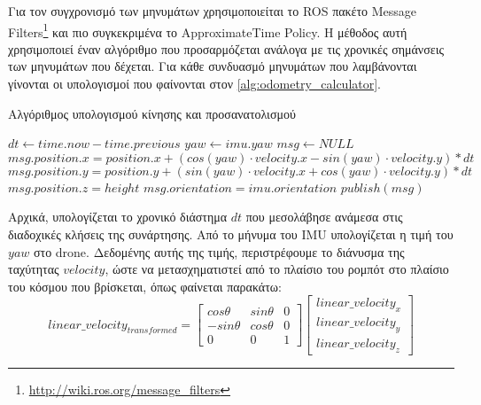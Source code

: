 Για τον συγχρονισμό των μηνυμάτων χρησιμοποιείται το ROS πακέτο Message Filters\footnote{\href{http://wiki.ros.org/message\_filters}{http://wiki.ros.org/message\_filters}} και πιο συγκεκριμένα το ApproximateTime Policy. Η μέθοδος αυτή χρησιμοποιεί έναν αλγόριθμο που προσαρμόζεται ανάλογα με τις χρονικές σημάνσεις των μηνυμάτων που δέχεται. Για κάθε συνδυασμό μηνυμάτων που λαμβάνονται γίνονται οι υπολογισμοί που φαίνονται στον \autoref{alg:odometry_calculator}.

\begin{algorithm}[!ht]
 \caption{Αλγόριθμος υπολογισμού κίνησης και προσανατολισμού}
 \label{alg:odometry_calculator}
 \begin{algorithmic}[1]
        \State $dt \gets time.now - time.previous$
        \State $yaw \gets imu.yaw$
        \State $msg \gets NULL$ 
        \State $msg.position.x = position.x + (cos(yaw) \cdot velocity.x - sin(yaw) \cdot velocity.y) * dt$
        \State $msg.position.y = position.y + (sin(yaw) \cdot velocity.x + cos(yaw) \cdot velocity.y) * dt$
        \State $msg.position.z = height$
        \State $msg.orientation = imu.orientation$ 
        \State $publish(msg)$
    \EndFunction 
    \end{algorithmic}
\end{algorithm}

Αρχικά, υπολογίζεται το χρονικό διάστημα $dt$ που μεσολάβησε ανάμεσα στις διαδοχικές κλήσεις της συνάρτησης. Από το μήνυμα του IMU υπολογίζεται η τιμή του $yaw$ στο drone. Δεδομένης αυτής της τιμής, περιστρέφουμε το διάνυσμα της ταχύτητας $velocity$, ώστε να μετασχηματιστεί από το πλαίσιο του ρομπότ στο πλαίσιο του κόσμου που βρίσκεται, όπως φαίνεται παρακάτω:
\begin{equation*}
     linear\_velocity_{transformed} = 
     \left[ {\begin{array}{ccc}
        cos\theta & sin\theta & 0 \\
        -sin\theta & cos\theta & 0 \\
        0 & 0 & 1
    \end{array} } \right]
    \left[ {\begin{array}{c}
        linear\_velocity_{x} \\
        linear\_velocity_{y} \\
        linear\_velocity_{z}
    \end{array} } \right]
\end{equation*}

